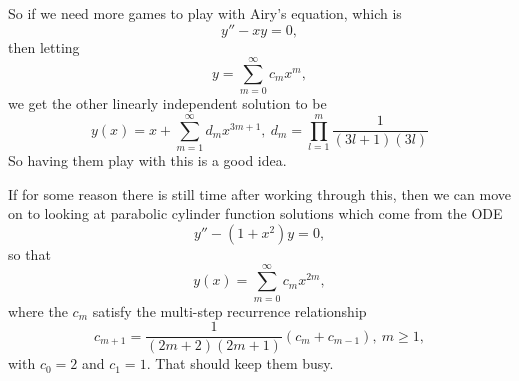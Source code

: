 \documentclass[a4paper,11pt]{article}
\begin{document}
So if we need more games to play with Airy's equation, which is
\[
y'' - xy = 0,
\]
then letting
\[
y = \sum_{m=0}^{\infty}c_{m}x^{m},
\]
we get the other linearly independent solution to be
\[
y(x) = x + \sum_{m=1}^{\infty}d_{m}x^{3m+1}, ~ d_{m} = \prod_{l=1}^{m}\frac{1}{(3l+1)(3l)}
\]
So having them play with this is a good idea.  

If for some reason there is still time after working through this, then we can move on to looking at parabolic cylinder function solutions which come from the ODE
\[
y'' - \left(1 + x^{2}\right)y = 0,
\]
so that 
\[
y(x) = \sum_{m=0}^{\infty}c_{m}x^{2m},
\]
where the $c_{m}$ satisfy the multi-step recurrence relationship
\[
c_{m+1} = \frac{1}{(2m+2)(2m+1)}\left(c_{m} + c_{m-1} \right), ~m\geq 1,
\]
with $c_{0}=2$ and $c_{1}=1$.  That should keep them busy.  
\end{document}
